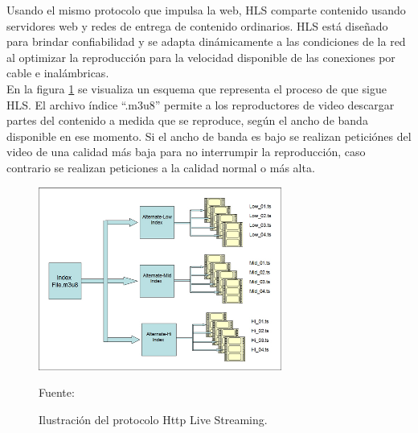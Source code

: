 Usando el mismo protocolo que impulsa la web, HLS comparte contenido usando servidores web y redes de entrega de contenido ordinarios. HLS está diseñado para brindar confiabilidad y se adapta dinámicamente a las condiciones de la red al optimizar la reproducción para la velocidad disponible de las conexiones por cable e inalámbricas.\\

En la figura \ref{fig:hls} se visualiza un esquema que representa el proceso de que sigue HLS. El archivo índice ``.m3u8'' permite a los reproductores de video descargar partes del contenido a medida que se reproduce, según el ancho de banda disponible en ese momento. Si el ancho de banda es bajo se realizan peticiónes del video de una calidad más baja para no interrumpir la reproducción, caso contrario se realizan peticiones a la calidad normal o más alta.
\begin{figure}[H]
    \begin{center}
        \includegraphics[width=8cm]{img/capitulo_2/hls.jpg}
    \end{center}
    \begin{center}
        \caption{Ilustración del protocolo Http Live Streaming.}
        Fuente: \cite{hls}
        \label{fig:hls}
    \end{center}
\end{figure}

